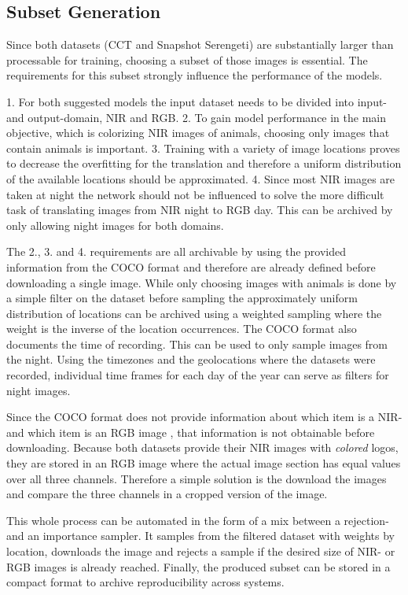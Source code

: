 \documentclass[a4paper,11pt, DIV=12]{scrartcl}
\begin{document}
\subsection{Subset Generation}
Since both datasets (CCT and Snapshot Serengeti) are substantially larger than processable for training, 
choosing a subset of those images is essential. The requirements for this subset strongly influence the performance 
of the models.

1. For both suggested models the input dataset needs to be divided into input- and output-domain, NIR and RGB.
2. To gain model performance in the main objective, which is colorizing NIR images of animals, 
choosing only images that contain animals is important.
3. Training with a variety of image locations proves to decrease the overfitting for the translation
and therefore a uniform distribution of the available locations should be approximated.
4. Since most NIR images are taken at night the network should not be influenced to solve the more difficult 
task of translating images from NIR night to RGB day. This can be archived by only allowing night images for both 
domains.

The 2., 3. and 4. requirements are all archivable by using the provided information from the COCO format and therefore 
are already defined before downloading a single image. 
While only choosing images with animals is done by a simple filter on the dataset before sampling the approximately uniform distribution 
of locations can be archived using a weighted sampling where the weight is the inverse of the location occurrences.
The COCO format also documents the time of recording. This can be used to only sample images from the night. 
Using the timezones and the geolocations where the datasets were recorded, individual time frames for each day of the year can serve as filters for night images.

Since the COCO format does not provide information about which item is a NIR- and which item is an RGB image \cite{caltech}, that information is not obtainable before downloading.
Because both datasets provide their NIR images with \textit{colored} logos, they are stored in an RGB image where the actual image section has equal values over all three channels.
Therefore a simple solution is the download the images and compare the three channels in a cropped version of the image. 

This whole process can be automated in the form of a mix between a rejection- and an importance sampler. It samples from the filtered dataset with weights by location, downloads the image and 
rejects a sample if the desired size of NIR- or RGB images is already reached. 
Finally, the produced subset can be stored in a compact format to archive reproducibility across systems.
\end{document}
